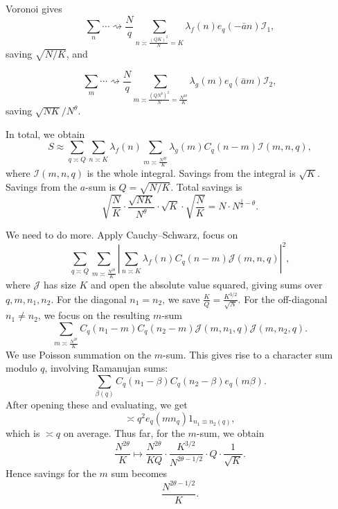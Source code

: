 \documentclass[reqno]{amsart} 
\begin{document}
Voronoi gives
\begin{equation*}
  \sum_{n} \dotsb \rightsquigarrow \frac{N}{q}
  \sum_{n \asymp \frac{(Q K)^2}{N} = K}
  \lambda_f(n) e_q(- \bar{a} n) \mathcal{I}_1,
\end{equation*}
saving $\sqrt{N / K }$, and

\begin{equation*}
  \sum_{m} \dotsb \rightsquigarrow \frac{N}{q} \sum_{m \asymp \frac{(Q N^\theta)^2}{N} = \frac{N^{2 \theta}}{K}}
  \lambda_g(m)
  e_q(\bar{a} m) \mathcal{I}_2,
\end{equation*}
saving $\sqrt{N K} / N^\theta$.

In total, we obtain
\begin{equation*}
  S \approx \sum_{q \asymp Q} \sum_{n \asymp  K} \lambda_f(n) \sum_{m \asymp \frac{N^{2 \theta}}{K}}
  \lambda_g(m) C_q(n - m)
  \mathcal{I}(m, n, q),
\end{equation*}
where $\mathcal{I}(m, n, q)$ is the whole integral.  Savings from the integral is $\sqrt{K}$.  Savings from the $a$-sum is $Q = \sqrt{N / K}$.  Total savings is
\begin{equation*}
  \sqrt{\frac{N}{K}}
  \cdot 
  \frac{\sqrt{N K}}{ N^\theta}
  \cdot 
  \sqrt{K}
  \cdot
  \sqrt{\frac{N}{K}}
  = N \cdot N^{\frac{1}{2} - \theta}.
\end{equation*}

We need to do more.  Apply Cauchy--Schwarz, focus on
\begin{equation*}
  \sum_{q \asymp Q}
  \sum_{m \asymp \frac{N^{2 \theta}}{K}}
  \left| \sum_{n \asymp K}
    \lambda_f(n)
    C_q(n - m)
    \mathcal{J}(m, n, q)\right|^2,
\end{equation*}
where $\mathcal{J}$ has size $K$ and open the absolute value squared, giving sums over $q, m, n_1, n_2$.  For the diagonal $n_1 = n_2$, we save $\frac{K}{Q} = \frac{K^{3/2}}{\sqrt{N}}$.  For the off-diagonal $n_1 \neq n_2$, we focus on the resulting $m$-sum
\begin{equation*}
  \sum_{m \asymp \frac{N^{2 \theta}}{K}}
  C_q(n_1 - m) C_q(n_2 - m)
  \mathcal{J}(m, n_1, q)
  \mathcal{J}(m, n_2, q).
\end{equation*}
We use Poisson summation on the $m$-sum.  This gives rise to a character sum modulo $q$, involving Ramanujan sums:
\begin{equation*}
  \sum_{\beta(q)} C_q(n_1 - \beta) C_q(n_2 - \beta) e_q(m \beta).
\end{equation*}
After opening these and evaluating, we get
\begin{equation*}
  \asymp q^2 e_q(m n_q) 1_{n_1 \equiv n_2(q)},
\end{equation*}
which is $\asymp q$ on average.  Thus far, for the $m$-sum, we obtain
\begin{equation*}
  \frac{N^{2 \theta}}{K}
  \mapsto \frac{N^{2 \theta}}{K Q}
  \cdot \frac{K^{3/2}}{N^{2 \theta - 1/2}}
  \cdot Q \cdot \frac{1}{\sqrt{K}}.
\end{equation*}
Hence savings for the $m$ sum becomes
\begin{equation*}
  \frac{N^{2 \theta  - 1/2}}{K}.
\end{equation*}
\end{document}
